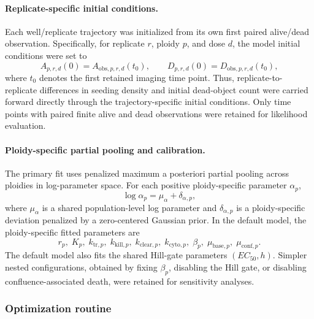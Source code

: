 \documentclass[11pt,notitlepage]{article}
\begin{document}
\paragraph{Replicate-specific initial conditions.}
Each well/replicate trajectory was initialized from its own first paired alive/dead observation. Specifically, for replicate \(r\), ploidy \(p\), and dose \(d\), the model initial conditions were set to
\[
A_{p,r,d}(0)=A_{\mathrm{obs},p,r,d}(t_0),
\qquad
D_{p,r,d}(0)=D_{\mathrm{obs},p,r,d}(t_0),
\]
where \(t_0\) denotes the first retained imaging time point. Thus, replicate-to-replicate differences in seeding density and initial dead-object count were carried forward directly through the trajectory-specific initial conditions. Only time points with paired finite alive and dead observations were retained for likelihood evaluation.


\paragraph{Ploidy-specific partial pooling and calibration.}
The primary fit uses penalized maximum a posteriori partial pooling across ploidies in log-parameter space. For each positive ploidy-specific parameter $\alpha_p$,
\[
\log \alpha_p=\mu_{\alpha}+\delta_{\alpha,p},
\]
where $\mu_{\alpha}$ is a shared population-level log parameter and $\delta_{\alpha,p}$ is a ploidy-specific deviation penalized by a zero-centered Gaussian prior. In the default model, the ploidy-specific fitted parameters are
\[
r_p,\; K_p,\; k_{\mathrm{tr},p},\; k_{\mathrm{kill},p},\; k_{\mathrm{clear},p},\; k_{\mathrm{cyto},p},\; \beta_p,\; \mu_{\mathrm{base},p},\; \mu_{\mathrm{conf},p}.
\]
The default model also fits the shared Hill-gate parameters $(EC_{50},h)$. Simpler nested configurations, obtained by fixing $\beta_p$, disabling the Hill gate, or disabling confluence-associated death, were retained for sensitivity analyses.


\subsubsection*{Optimization routine}
\end{document}
